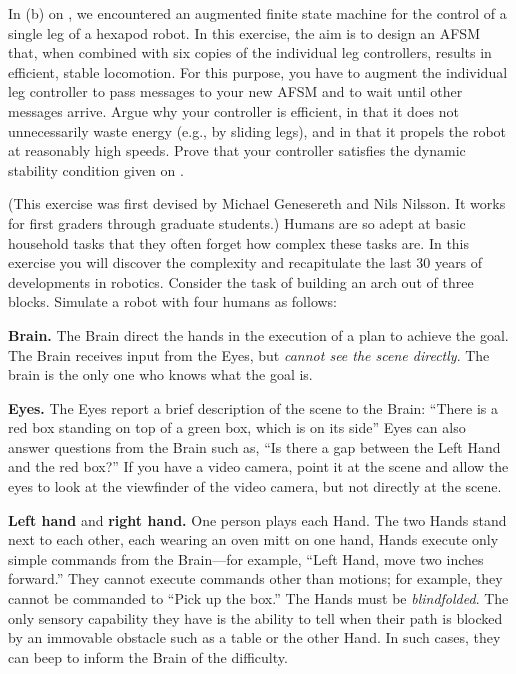 \begin{exercise}%
In (b) on , we encountered an augmented finite state
machine for the control of a single leg of a hexapod robot. In this
exercise, the aim is to design an AFSM that, when combined with
six copies of the individual leg controllers, results in efficient, stable locomotion.
For this purpose, you have to augment the individual leg
controller to pass messages to your new AFSM and to wait until other
messages arrive. Argue why your controller is efficient, in
that it does not unnecessarily waste energy (e.g., by sliding legs),
and in that it propels the robot at reasonably high speeds.
Prove that your controller satisfies the dynamic stability condition
given on .
\end{exercise} 



\begin{exercise}%
(This exercise was first devised by Michael
Genesereth and Nils Nilsson. It works for first graders through graduate students.)  Humans
are so adept at basic household tasks 
that they often forget how complex these tasks are. In this exercise
you will discover the complexity and recapitulate the last 30 years of
developments in robotics. 
Consider the task of building an arch out of three blocks. Simulate a robot 
with four humans as follows:

{\bf Brain.} The Brain direct the hands in the execution of a
plan to achieve the goal. The Brain receives input from the Eyes, but {\em cannot see the
scene directly}. The brain is the only one who knows what the goal is.

{\bf Eyes.} The Eyes report a brief description of the
scene to the Brain:
``There is a red box standing on top of a green box, which is on its
side'' Eyes can also answer
questions from the Brain such as, ``Is there a gap between the Left
Hand and the red box?'' If you have a video camera, point it at the
scene and allow the eyes to look at the viewfinder of the video camera,
but not directly at the scene.
 
{\bf Left hand} and {\bf right hand.}  One person plays each Hand.
The two Hands stand next to each other, each wearing an oven mitt on one hand,
Hands execute only simple commands from the Brain---for example,
``Left Hand, move two inches forward.'' They cannot execute commands
other than motions; for example, they cannot be commanded to ``Pick up the box.'' 
The Hands must be {\em blindfolded}. The only sensory capability they
have is the ability to tell when their path is blocked by an immovable
obstacle such as a table or the other Hand. In such cases, they can
beep to inform the Brain of the difficulty.
\end{exercise} 



